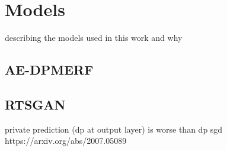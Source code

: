 \section{Models}\label{chapter4}
describing the models used in this work and why

\subsection{AE-DPMERF}

\subsection{RTSGAN}
private prediction (dp at output layer) is worse than dp sgd 
https://arxiv.org/abs/2007.05089